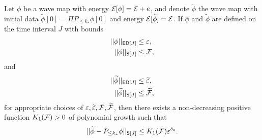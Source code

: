 \begin{proposition}\label{prop:lowfreq}
	Let $\phi$ be a wave map with energy $\mathcal E[\phi] = \mathcal E + e$, and denote $\widetilde \phi$ the wave map with initial data $\widetilde \phi[0] = \Pi P_{\leq k_*} \phi[0]$ and energy $\mathcal E[\widetilde \phi] = \mathcal E$. If $\phi$ and $\widetilde \phi$ are defined on the time interval $J$ with bounds
		\begin{align}
			||\phi||_{\mathsf{ED}[J]} 
				&\leq \varepsilon, \\
			||\phi||_{\mathsf S[J]}
				&\leq \mathcal F, 	
		\end{align}
	and
		\begin{align}
			||\widetilde\phi||_{\mathsf{ED}[J]} 
				&\leq \widetilde{\varepsilon}, \\
			||\widetilde\phi||_{\mathsf S[J]}
				&\leq \widetilde{\mathcal F}, 	
		\end{align}	
	for appropriate choices of $\varepsilon, \widetilde{\varepsilon}, \mathcal F, \widetilde{\mathcal F}$, then there exists a non-decreasing positive function $K_{1}(\mathcal F) > 0$ of polynomial growth such that 
	\begin{equation}
		|| \widetilde \phi - P_{\leq k_*} \phi||_{\mathsf S[J]} \leq K_{1} (\mathcal F) \varepsilon^{\delta_0}.\label{eq:lowfreq}
	\end{equation}
\end{proposition}

